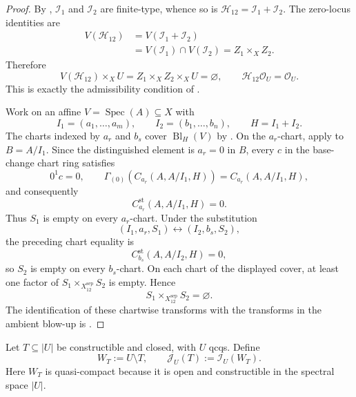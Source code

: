 \begin{proof}
  By ,
  $\mathcal I_1$ and $\mathcal I_2$ are finite-type, whence so is
  $\mathcal H_{12}=\mathcal I_1+\mathcal I_2$.  The zero-locus identities are
  \[
  \begin{aligned}
    V(\mathcal H_{12})
      &=V(\mathcal I_1+\mathcal I_2)\\
      &=V(\mathcal I_1)\cap V(\mathcal I_2)
       =Z_1\times_XZ_2.
  \end{aligned}
  \]
  Therefore
  \[
    V(\mathcal H_{12})\times_XU
      =Z_1\times_XZ_2\times_XU=\varnothing,
    \qquad
    \mathcal H_{12}\mathcal O_U=\mathcal O_U.
  \]
  This is exactly the admissibility condition of
  .

  Work on an affine $V=\operatorname{Spec}(A)\subseteq X$ with
  \[
    I_1=(a_1,\ldots,a_m),\qquad
    I_2=(b_1,\ldots,b_n),\qquad H=I_1+I_2.
  \]
  The charts indexed by $a_r$ and $b_s$ cover
  $\operatorname{Bl}_H(V)$ by
  .  On the $a_r$-chart, apply
   to $B=A/I_1$.  Since the
  distinguished element is $a_r=0$ in $B$, every $c$ in the base-change
  chart ring satisfies
  \[
    0^1c=0,\qquad
    \Gamma_{(0)}(C_{a_r}(A,A/I_1,H))=C_{a_r}(A,A/I_1,H),
  \]
  and consequently
  \[
    C_{a_r}^{\mathrm{st}}(A,A/I_1,H)=0.
  \]
  Thus $S_1$ is empty on every $a_r$-chart.  Under the substitution
  \[
    (I_1,a_r,S_1)\longleftrightarrow(I_2,b_s,S_2),
  \]
  the preceding chart equality is
  \[
    C_{b_s}^{\mathrm{st}}(A,A/I_2,H)=0,
  \]
  so $S_2$ is empty on every $b_s$-chart.  On each chart of the displayed
  cover, at least one factor of $S_1\times_{X^{\mathrm{sep}}_{12}}S_2$ is
  empty.  Hence
  \[
    S_1\times_{X^{\mathrm{sep}}_{12}}S_2=\varnothing.
  \]
  The identification of these chartwise transforms with the transforms in
  the ambient blow-up is
  .
\end{proof}

\begin{definition}
  \label{def:nagata-constructible-closed-support}
  \lean{}

  Let $T\subseteq|U|$ be constructible and closed, with $U$ qcqs.  Define
  \[
    W_T:=U\setminus T,\qquad
    \mathcal J_U(T):=\mathcal I_U(W_T).
  \]
  Here $W_T$ is quasi-compact because it is open and constructible in the
  spectral space $|U|$.
\end{definition}

